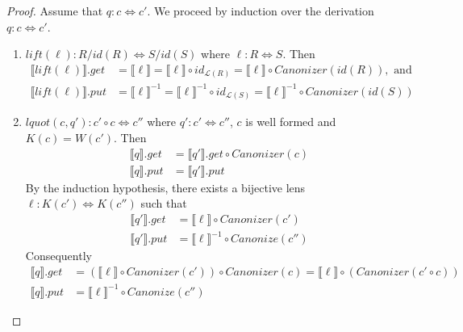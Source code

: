 \documentclass{svproc}
\newcommand{\canonizer}{\ensuremath{\mathit{Canonizer}}}
\begin{document}
\begin{proof}
  Assume that $q : c \Leftrightarrow c'$. We proceed by induction over the
  derivation $q : c \Leftrightarrow c'$.
  \begin{enumerate}
  \item
    $\mathit{lift}(\ell): R/\mathit{id}(R) \Leftrightarrow S/\mathit{id}(S)$ where
    $\ell :
    R \Leftrightarrow S$. Then
    \begin{align*}
      \llbracket \mathit{lift}(\ell) \rrbracket.get &=  \llbracket \ell \rrbracket
                                                      = \llbracket \ell \rrbracket \circ id_{\mathcal{L}(R)} =
                                                      \llbracket \ell \rrbracket \circ \canonizer(\mathit{id}(R)), \text{ and }\\
      \llbracket \mathit{lift}(\ell) \rrbracket.put &= \llbracket \ell
                                                      \rrbracket^{-1} = \llbracket \ell \rrbracket^{-1} \circ id_{\mathcal{L}(S)} =
                                                      \llbracket \ell \rrbracket^{-1} \circ \canonizer(id(S))
    \end{align*}
  \item
    $\mathit{lquot}(c, q'): c' \circ c \Leftrightarrow c''$ where $q' : c' 
    \Leftrightarrow c''$, $c$ is well formed and $K(c) = W(c')$. Then
    \begin{align*}
      \llbracket q \rrbracket.get  &= \llbracket q'
                                     \rrbracket.get \circ \canonizer(c)\\
      \llbracket q \rrbracket.put &= \llbracket q' \rrbracket.put
    \end{align*}
    By the induction hypothesis, there exists a bijective lens $\ell :
    K(c') \Leftrightarrow K(c'')$ such that 
    \begin{align*}
      \llbracket q' \rrbracket.get &= \llbracket \ell \rrbracket \circ \canonizer(c')\\
      \llbracket q' \rrbracket.put &= \llbracket \ell \rrbracket^{-1} \circ
                                     Canonize(c'')
    \end{align*}
    Consequently
    \begin{align*}
      \llbracket q \rrbracket.get  &= (\llbracket \ell \rrbracket \circ
                                     \canonizer(c')) \circ \canonizer(c) = \llbracket \ell \rrbracket \circ
                                     (\canonizer(c' \circ c))\\
      \llbracket q \rrbracket.put &= \llbracket \ell \rrbracket^{-1} \circ
                                    Canonize(c'')
    \end{align*}


\end{enumerate}
\end{proof}
\end{document}
